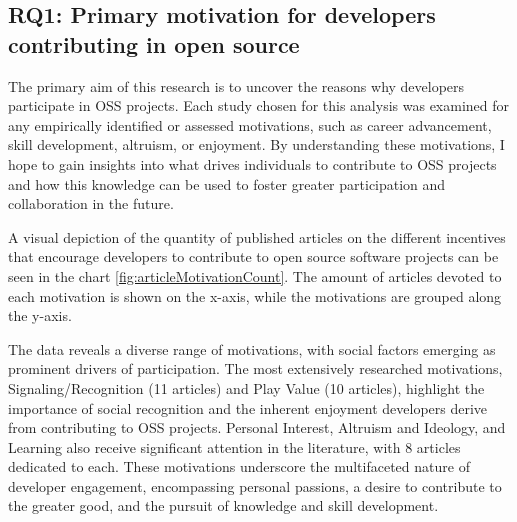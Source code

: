 % 







\subsection{RQ1: Primary motivation for developers contributing in open source}

The primary aim of this research is to uncover the reasons why developers participate in OSS projects. Each study chosen for this analysis was examined for any empirically identified or assessed motivations, such as career advancement, skill development, altruism, or enjoyment. By understanding these motivations, I hope to gain insights into what drives individuals to contribute to OSS projects and how this knowledge can be used to foster greater participation and collaboration in the future.

A visual depiction of the quantity of published articles on the different incentives that encourage developers to contribute to open source software projects can be seen in the chart \ref{fig:articleMotivationCount}. The amount of articles devoted to each motivation is shown on the x-axis, while the motivations are grouped along the y-axis.

The data reveals a diverse range of motivations, with social factors emerging as prominent drivers of participation. The most extensively researched motivations, Signaling/Recognition (11 articles) and Play Value (10 articles), highlight the importance of social recognition and the inherent enjoyment developers derive from contributing to OSS projects. Personal Interest, Altruism and Ideology, and Learning also receive significant attention in the literature, with 8 articles dedicated to each. These motivations underscore the multifaceted nature of developer engagement, encompassing personal passions, a desire to contribute to the greater good, and the pursuit of knowledge and skill development.

